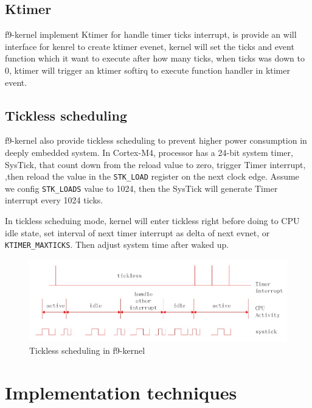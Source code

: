 \documentclass[10pt,preprint,nocopyrightspace]{sigplanconf}
\begin{document}
\subsection{Ktimer}
f9-kernel implement Ktimer for handle timer ticks interrupt, is provide an will interface for kenrel to create ktimer evenet, kernel will set the ticks and event function which it want to execute after how many ticks, when ticks was down to 0, ktimer will trigger an ktimer softirq to execute function handler in ktimer event. 

\subsection{Tickless scheduling}

f9-kernel also provide tickless scheduling to prevent higher power consumption in deeply embedded system\cite{freertos1,freertos2}. In Cortex-M4, processor has a 24-bit system timer, SysTick, that count down from the reload value to zero, trigger Timer interrupt, ,then reload the value in the \verb|STK_LOAD| register on the next clock edge\cite{st2016manual}. Assume we config \verb|STK_LOADS| value to 1024, then the SysTick will generate Timer interrupt every 1024 ticks.

In tickless scheduing mode, kernel will enter tickless right before doing to CPU idle state, set interval of next timer interrupt as delta of next evnet, or \verb|KTIMER_MAXTICKS|. Then adjust system time after waked up.

\begin{figure}[H]
	\begin{center}
		\includegraphics[width=\linewidth]{picture/tickless.png}
	\end{center}
	\caption{Tickless scheduling in f9-kernel}
\end{figure}

\section{Implementation techniques}
\end{document}
